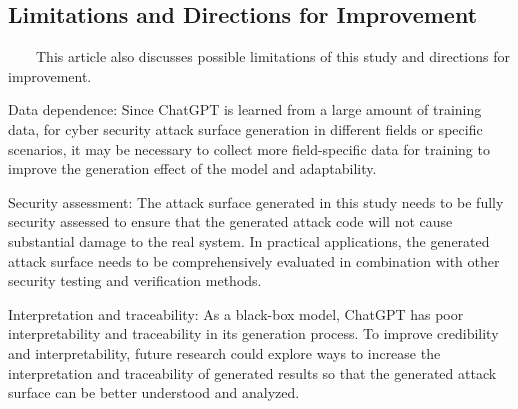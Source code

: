 \documentclass[runningheads]{llncs}
\begin{document}
\subsection{Limitations and Directions for Improvement}
%
\ \ \ \ This article also discusses possible limitations of this study and directions for improvement.\par
%
Data dependence: Since ChatGPT is learned from a large amount of training data, for cyber security attack surface generation in different fields or specific scenarios, it may be necessary to collect more field-specific data for training to improve the generation effect of the model and adaptability.\par
%
Security assessment: The attack surface generated in this study needs to be fully security assessed to ensure that the generated attack code will not cause substantial damage to the real system. In practical applications, the generated attack surface needs to be comprehensively evaluated in combination with other security testing and verification methods.\par
%
Interpretation and traceability: As a black-box model, ChatGPT has poor interpretability and traceability in its generation process. To improve credibility and interpretability, future research could explore ways to increase the interpretation and traceability of generated results so that the generated attack surface can be better understood and analyzed.\par
%
%
\end{document}
